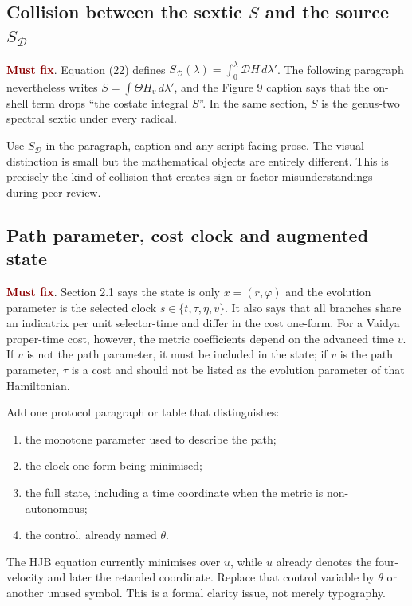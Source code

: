\documentclass[11pt,a4paper]{article}
\newcommand{\must}{\textcolor{DarkRed}{\textbf{Must fix}}}
\newcommand{\SD}{S_{\mathcal D}}
\begin{document}
\subsection{Collision between the sextic $S$ and the source $\SD$}

\must. Equation (22) defines $\SD(\lambda)=\int_0^\lambda \mathcal D H\,d\lambda'$. The
following paragraph nevertheless writes $S=\int\Theta H_v\,d\lambda'$, and the Figure 9
caption says that the on-shell term drops ``the costate integral $S$''. In the same section,
$S$ is the genus-two spectral sextic under every radical.

Use $\SD$ in the paragraph, caption and any script-facing prose. The visual distinction is
small but the mathematical objects are entirely different. This is precisely the kind of
collision that creates sign or factor misunderstandings during peer review.

\subsection{Path parameter, cost clock and augmented state}

\must. Section 2.1 says the state is only $x=(r,\varphi)$ and the evolution parameter is the
selected clock $s\in\{t,\tau,\eta,v\}$. It also says that all branches share an indicatrix per
unit selector-time and differ in the cost one-form. For a Vaidya proper-time cost, however, the
metric coefficients depend on the advanced time $v$. If $v$ is not the path parameter, it must
be included in the state; if $v$ is the path parameter, $\tau$ is a cost and should not be
listed as the evolution parameter of that Hamiltonian.

Add one protocol paragraph or table that distinguishes:
\begin{enumerate}
  \item the monotone parameter used to describe the path;
  \item the clock one-form being minimised;
  \item the full state, including a time coordinate when the metric is non-autonomous;
  \item the control, already named $\theta$.
\end{enumerate}
The HJB equation currently minimises over $u$, while $u$ already denotes the four-velocity and
later the retarded coordinate. Replace that control variable by $\theta$ or another unused
symbol. This is a formal clarity issue, not merely typography.
\end{document}
